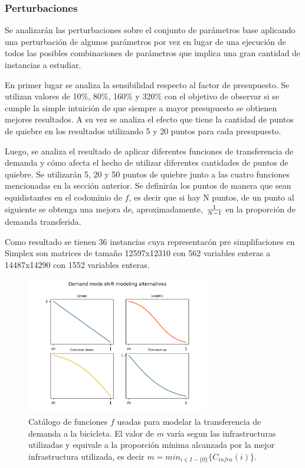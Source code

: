 \documentclass{article}
\begin{document}
  \subsubsection*{Perturbaciones}

  Se analizarán las perturbaciones sobre el conjunto de parámetros base aplicando una perturbación de algunos parámetros por vez en lugar de una ejecución de todos las posibles combinaciones de parámetros que implica una gran cantidad de instancias a estudiar.

  En primer lugar se analiza la sensibilidad respecto al factor de presupuesto. Se utilizan valores de 10\%, 80\%, 160\% y 320\% con el objetivo de observar si se cumple la simple intuición de que siempre a mayor presupuesto se obtienen mejores resultados. A su vez se analiza el efecto que tiene la cantidad de puntos de quiebre en los resultados utilizando 5 y 20 puntos para cada presupuesto.

  Luego, se analiza el resultado de aplicar diferentes funciones de transferencia de demanda y cómo afecta el hecho de utilizar diferentes cantidades de puntos de quiebre. Se utilizarán 5, 20 y 50 puntos de quiebre junto a las cuatro funciones mencionadas en la sección anterior. Se definirán los puntos de manera que sean equidistantes en el codominio de $f$, es decir que si hay N puntos, de un punto al siguiente se obtenga una mejora de, aproximadamente, ${1 \over N - 1}$ en la proporción de demanda transferida.

  Como resultado se tienen 36 instancias cuya representacón pre simplifaciones en Simplex son matrices de tamaño 12597x12310 con 562 variables enteras a 14487x14290 con 1552 variables enteras.

  \begin{figure}[h!]
    \centering
    \includegraphics[width=8cm]{../resources/f_catalog.png}
      \caption{Catálogo de funciones $f$ usadas para modelar la transferencia de demanda a la bicicleta. El valor de $m$ varía segun las infrastructuras utilizadas y equivale a la proporción mínima alcanzada por la mejor infrastructura utilizada, es decir $m = min_{i \in I - \{0\}} \{ C_{infra}(i) \}$.}
    \label{fig:fcatalog}
  \end{figure}
\end{document}
